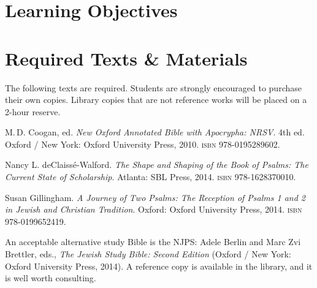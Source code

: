 \documentclass[titlepage]{article}
\newcommand\incl{../includes}
\begin{document}


\section{Learning Objectives}
\label{objectives}
\edobject

\section{Required Texts \& Materials}
\label{texts}

The following texts are required. Students are strongly encouraged to
purchase their own copies. Library copies that are not reference works
will be placed on a 2-hour reserve.

\begingroup
\renewcommand{\section}[2]{}%
\begin{thebibliography}{Shape \& Shaping}%

	 M.\,D. Coogan, ed.
    \emph{New Oxford Annotated Bible with Apocrypha: NRSV}. 4th ed.
    Oxford / New York: Oxford University Press, 2010.
    \textsc{isbn} 978-0195289602.


	 Nancy L. deClaissé-Walford.
	\emph{The Shape and Shaping of the Book of Psalms: The Current State of Scholarship}.
	Atlanta: SBL Press, 2014.
	\textsc{isbn} 978-1628370010.

	 Susan Gillingham.
	\emph{A Journey of Two Psalms: The Reception of Psalms 1 and 2 in Jewish and Christian Tradition}.
	Oxford: Oxford University Press, 2014.
	\textsc{isbn} 978-0199652419.


\end{thebibliography}
\endgroup

An acceptable alternative study Bible is the NJPS: Adele Berlin and Marc
Zvi Brettler, eds., \emph{The Jewish Study Bible: Second Edition}
(Oxford / New York: Oxford University Press, 2014). A reference copy is
available in the library, and it is well worth consulting.
\end{document}
